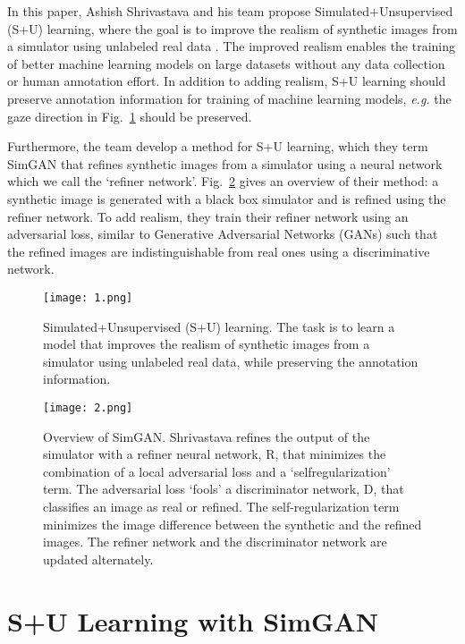 \documentclass[10pt,twocolumn,letterpaper]{article}
\begin{document}
In this paper, Ashish Shrivastava and his team propose Simulated+Unsupervised (S+U) learning, where the goal is to improve the realism of synthetic images from a simulator using unlabeled real data \cite{Shrivastava2017Learning}. The improved realism enables the training of better machine learning models on large datasets without any data collection or human annotation effort. In addition to adding realism, S+U learning should preserve annotation information for training of machine learning models, \emph{e.g.} the gaze direction in Fig.~\ref{fig:1} should be preserved.

Furthermore, the team develop a method for S+U learning, which they term SimGAN that refines synthetic images from a simulator using a neural network which we call the `refiner network'. Fig.~\ref{fig:2} gives an overview of their method: a synthetic image is generated with a black box simulator and is refined using the refiner network. To add realism, they train their refiner network using an adversarial loss, similar to Generative Adversarial Networks (GANs) \cite{Goodfellow2014Generative} such that the refined images are indistinguishable from real ones using a discriminative network.
\begin{figure}
	\begin{center}
		\texttt{[image: 1.png]}
	\end{center}
	\caption{Simulated+Unsupervised (S+U) learning. The task is to learn a model that improves the realism of synthetic images from a simulator using unlabeled real data, while preserving the annotation information.}
	\label{fig:1}
\end{figure}
\begin{figure}
	\begin{center}
		\texttt{[image: 2.png]}
	\end{center}
	\caption{Overview of SimGAN. Shrivastava refines the output of the simulator with a refiner neural network, R, that minimizes the combination of a local adversarial loss and a `selfregularization' term. The adversarial loss `fools' a discriminator network, D, that classifies an image as real or refined. The self-regularization term minimizes the image difference between the synthetic and the refined images. The refiner network and the discriminator network are updated alternately.}
	\label{fig:2}
\end{figure}

\section{S+U Learning with SimGAN}
\end{document}
